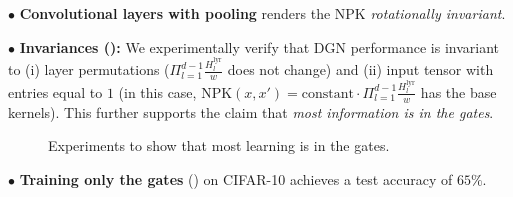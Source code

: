 $\bullet$ \textbf{Convolutional layers with pooling} renders the NPK \emph{rotationally invariant}. 

$\bullet$ \textbf{Invariances ():} We experimentally verify that DGN performance is invariant to (i) layer permutations ($\Pi_{l=1}^{d-1} \frac{H^{\text{lyr}}_l}{w}$ does not change) and (ii) input tensor with entries equal to $1$ (in this case, NPK$(x,x')= \text{constant}\cdot \Pi_{l=1}^{d-1} \frac{H^{\text{lyr}}_l}{w}$ has the base kernels). This further supports the claim that \emph{most information is in the gates}. %
\FloatBarrier
\begin{figure}[h]
\centering
{}
\caption{Experiments to show that most learning is in the gates.}
\label{fig:permutations}
\end{figure}

$\bullet$ \textbf{Training only the gates} () on CIFAR-10 achieves a test accuracy of $65\%$.

